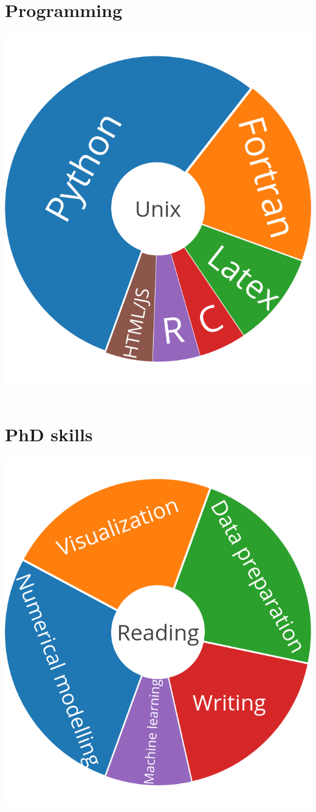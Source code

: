 \documentclass[]{friggeri-cv}
\begin{document}
\begin{aside}
  \section{Programming}
    \includegraphics[scale=0.15]{img/programing.png}
    ~
  \section{PhD skills}
    \includegraphics[scale=0.15]{img/PhD.png}
    ~
\end{aside}
\end{document}
